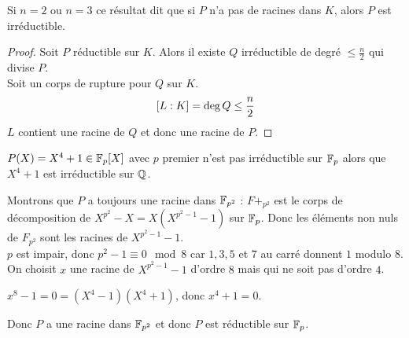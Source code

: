 \begin{remarque}
	Si $n = 2$ ou $n = 3$ ce résultat dit que si $P$ n'a pas de racines dans $K$, alors $P$ est irréductible.
\end{remarque}


\begin{proof}
	Soit $P$ réductible sur $K$. Alors il existe $Q$ irréductible de degré $\leq \frac{n}{2}$ qui divise $P$.\\
	Soit un corps de rupture pour $Q$ sur $K$.\\
	$$[ L : K ] = \deg Q \leq \frac{n}{2}$$
	$L$ contient une racine de $Q$ et donc une racine de $P$.
\end{proof}



\begin{example}
	$P(X) = X^4 + 1 \in \mathbb{F}_p[X]$ avec $p$ premier n'est pas irréductible sur $\mathbb{F}_p$ alors que $X^4 + 1$ est irréductible sur $\mathbb{Q}$.

	Montrons que $P$ a toujours une racine dans $\mathbb{F}_{p^2}$ :
	$F+_{p^2}$ est le corps de décomposition de $X^{p^2} - X = X (X^{p^2-1} - 1)$ sur $\mathbb{F}_p$.
	Donc les éléments non nuls de $F_{p^2}$ sont les racines de $X^{p^2-1} - 1$.\\
	$p$ est impair, donc $p^2 - 1 \equiv 0 \mod 8$ car $1,3,5$ et $7$ au carré donnent $1$ modulo $8$.\\

	On choisit $x$ une racine de $X^{p^2-1} - 1$ d'ordre $8$ mais qui ne soit pas d'ordre $4$.

	$x^8-1 = 0 = (X^4-1)(X^4+1)$, donc $x^4 + 1 = 0$.

	Donc $P$ a une racine dans $\mathbb{F}_{p^2}$ et donc $P$ est réductible sur $\mathbb{F}_p$.
\end{example}



